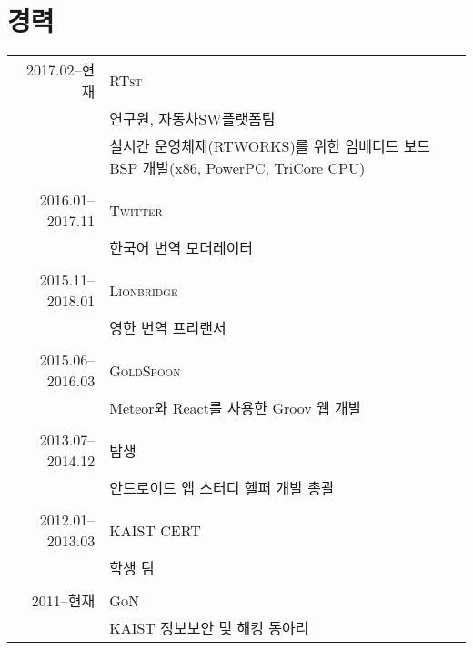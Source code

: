 \documentclass[a4paper,10pt]{article}
\begin{document}
\section{경력}
\begin{tabular}{r|p{11cm}}
  \textsc{2017.02--현재} & \textsc{RTst} \\
                         & 연구원, 자동차SW플랫폼팀 \\
                         & 실시간 운영체제(RTWORKS)를 위한 임베디드 보드 BSP 개발(x86, PowerPC, TriCore CPU) \\
  \multicolumn{2}{c}{} \\

  \textsc{2016.01--2017.11} & \textsc{Twitter} \\
                         & 한국어 번역 모더레이터 \\
  \multicolumn{2}{c}{} \\

  \textsc{2015.11--2018.01} & \textsc{Lionbridge} \\
                         & 영한 번역 프리랜서 \\
  \multicolumn{2}{c}{} \\

  \textsc{2015.06--2016.03} & \textsc{GoldSpoon} \\
                            & Meteor와 React를 사용한 \href{http://groov.fm}{Groov} 웹 개발 \\
  \multicolumn{2}{c}{} \\

  \textsc{2013.07--2014.12} & \textsc{탐생} \\
                            & 안드로이드 앱 \href{https://play.google.com/store/apps/details?id=kr.co.tamseng.StudyHelper}{스터디 헬퍼} 개발 총괄 \\
  \multicolumn{2}{c}{} \\

  \textsc{2012.01--2013.03} & \textsc{KAIST CERT} \\
                            & 학생 팀 \\
  \multicolumn{2}{c}{} \\

  \textsc{2011--현재} & \textsc{GoN} \\
                      & KAIST 정보보안 및 해킹 동아리 \\
\end{tabular}
\end{document}
